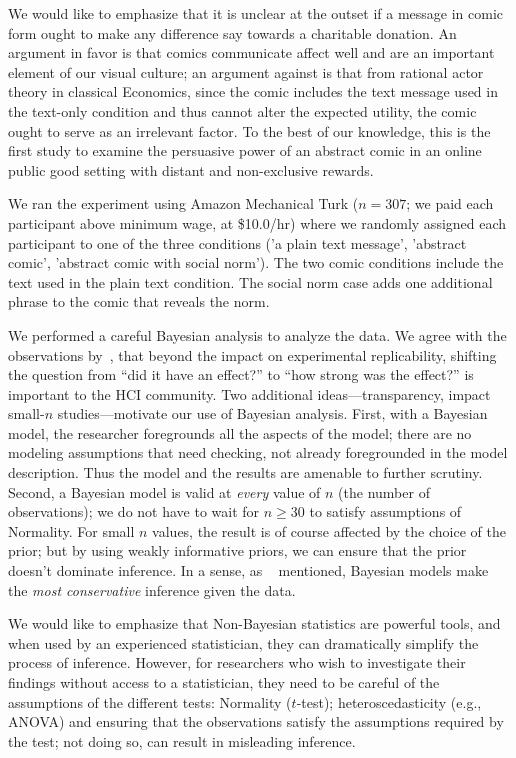 We would like to emphasize that it is unclear at the outset if a message in comic form ought to make any difference say towards a charitable donation. An argument in favor is that comics communicate affect well and are an important element of our visual culture; an argument against is that from rational actor theory in classical Economics, since the comic includes the text message used in the text-only condition and thus cannot alter the expected utility, the comic ought to serve as an irrelevant factor. To the best of our knowledge, this is the first study to examine the persuasive power of an abstract comic in an online public good setting with distant and non-exclusive rewards. 

We ran the experiment using Amazon Mechanical Turk ($n=307$; we paid each participant above minimum wage, at \$10.0/hr) where we randomly assigned each participant to one of the three conditions ('a plain text message', 'abstract comic', 'abstract comic with social norm'). The two comic conditions include the text used in the plain text condition. The social norm case adds one additional phrase to the comic that reveals the norm.

We performed a careful Bayesian analysis to analyze the data. We agree with the observations by~\textcite{Kay2016}, that beyond the impact on experimental replicability, shifting the question from ``did it have an effect?'' to ``how strong was the effect?'' is important to the HCI community. Two additional ideas---transparency, impact small-$n$ studies---motivate our use of Bayesian analysis. First, with a Bayesian model, the researcher foregrounds all the aspects of the model; there are no modeling assumptions that need checking, not already foregrounded in the model description. Thus the model and the results are amenable to further scrutiny. Second, a Bayesian model is valid at \textit{every} value of $n$ (the number of observations); we do not have to wait for $n\geq 30$ to satisfy assumptions of Normality. For small $n$ values, the result is of course affected by the choice of the prior; but by using weakly informative priors, we can ensure that the prior doesn't dominate inference. In a sense, as ~\textcite[][Chapter 9]{McElreath2015} mentioned, Bayesian models make the \textit{most conservative} inference given the data.

We would like to emphasize that Non-Bayesian statistics are powerful tools, and when used by an experienced statistician, they can dramatically simplify the process of inference. However, for researchers who wish to investigate their findings without access to a statistician, they need to be careful of the assumptions of the different tests: Normality ($t$-test); heteroscedasticity (e.g., ANOVA) and ensuring that the observations satisfy the assumptions required by the test; not doing so, can result in misleading inference.


